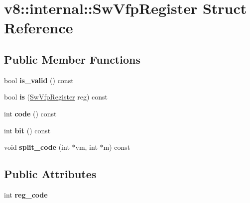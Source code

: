 \hypertarget{structv8_1_1internal_1_1_sw_vfp_register}{}\section{v8\+:\+:internal\+:\+:Sw\+Vfp\+Register Struct Reference}
\label{structv8_1_1internal_1_1_sw_vfp_register}
\subsection*{Public Member Functions}
\begin{DoxyCompactItemize}
\item 
bool {\bfseries is\+\_\+valid} () const \hypertarget{structv8_1_1internal_1_1_sw_vfp_register_a3f1f3f18bfce409e9f97e3d60972d7bd}{}\label{structv8_1_1internal_1_1_sw_vfp_register_a3f1f3f18bfce409e9f97e3d60972d7bd}

\item 
bool {\bfseries is} (\hyperlink{structv8_1_1internal_1_1_sw_vfp_register}{Sw\+Vfp\+Register} reg) const \hypertarget{structv8_1_1internal_1_1_sw_vfp_register_acf8efa0eeb628342148747595a10727e}{}\label{structv8_1_1internal_1_1_sw_vfp_register_acf8efa0eeb628342148747595a10727e}

\item 
int {\bfseries code} () const \hypertarget{structv8_1_1internal_1_1_sw_vfp_register_a683a5884d27d847dc442174568bbbc3a}{}\label{structv8_1_1internal_1_1_sw_vfp_register_a683a5884d27d847dc442174568bbbc3a}

\item 
int {\bfseries bit} () const \hypertarget{structv8_1_1internal_1_1_sw_vfp_register_a758d26002b59332cca419d594b37e705}{}\label{structv8_1_1internal_1_1_sw_vfp_register_a758d26002b59332cca419d594b37e705}

\item 
void {\bfseries split\+\_\+code} (int $\ast$vm, int $\ast$m) const \hypertarget{structv8_1_1internal_1_1_sw_vfp_register_ab6b8de7a0efed3c5c73babfee2b3bb89}{}\label{structv8_1_1internal_1_1_sw_vfp_register_ab6b8de7a0efed3c5c73babfee2b3bb89}

\end{DoxyCompactItemize}
\subsection*{Public Attributes}
\begin{DoxyCompactItemize}
\item 
int {\bfseries reg\+\_\+code}\hypertarget{structv8_1_1internal_1_1_sw_vfp_register_ae6a74dcaa1a06476368a8e6b38e5ef2e}{}\label{structv8_1_1internal_1_1_sw_vfp_register_ae6a74dcaa1a06476368a8e6b38e5ef2e}

\end{DoxyCompactItemize}

